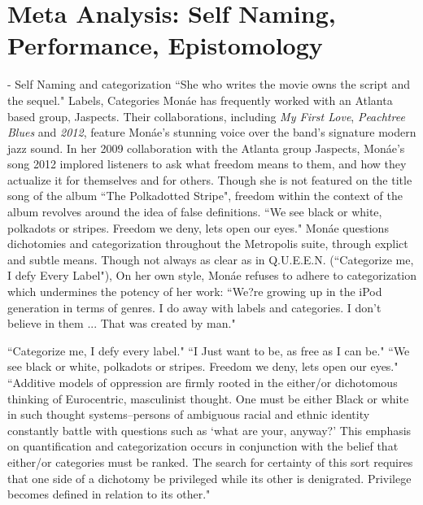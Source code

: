 \documentclass[a4paper, 11pt]{article} %
\begin{document}

\section*{Meta Analysis: Self Naming, Performance, Epistomology}

- Self Naming and categorization
``She who writes the movie owns the script and the sequel."\cite{queen}
Labels, Categories
Mon\'ae has frequently worked with an Atlanta based group, Jaspects.
Their collaborations, including \emph{My First Love}, \emph{Peachtree Blues} and \emph{2012}, feature Mon\'ae's stunning voice over the band's signature modern jazz sound\cite{peachtreeblues}\cite{myfirstlove}.
In her 2009 collaboration with the Atlanta group Jaspects, Mon\'ae's song 2012 implored listeners to ask what freedom means to them, and how they actualize it for themselves and for others.
Though she is not featured on the title song of the album ``The Polkadotted Stripe", freedom within the context of the album revolves around the idea of false definitions.
``We see black or white, polkadots or stripes. Freedom we deny, lets open our eyes."\cite{polkadottedstripe}
Mon\'ae questions dichotomies and categorization throughout the Metropolis suite, through explict and subtle means.
Though not always as clear as in Q.U.E.E.N. (``Categorize me, I defy Every Label"\cite{queen}), 
On her own style, Mon\'ae refuses to adhere to categorization which undermines the potency of her work:
``We?re growing up in the iPod generation in terms of genres. I do away with labels and categories. I don't believe in them ... That was created by man."\cite{joeyguerra2010}


``Categorize me, I defy every label."\cite{queen}
``I Just want to be, as free as I can be."\cite{polkadottedstripe}
``We see black or white, polkadots or stripes. Freedom we deny, lets open our eyes."\cite{polkadottedstripe}
``Additive models of oppression are firmly rooted in the either/or dichotomous thinking of Eurocentric, masculinist thought. One must be either Black or white in such thought systems--persons of ambiguous racial and ethnic identity constantly battle with questions such as `what are your, anyway?' This emphasis on quantification and categorization occurs in conjunction with the belief that either/or categories must be ranked. The search for certainty of this sort requires that one side of a dichotomy be privileged while its other is denigrated. Privilege becomes defined in relation to its other."\cite{collins2009}
\end{document}
